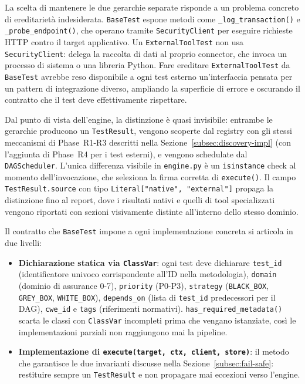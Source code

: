 

La scelta di mantenere le due gerarchie separate risponde a un problema concreto di ereditarietà indesiderata. \texttt{BaseTest} espone metodi come \texttt{\_log\_transaction()} e \texttt{\_probe\_endpoint()}, che operano tramite \texttt{SecurityClient} per eseguire richieste \gls{HTTP} contro il target applicativo. Un \texttt{ExternalToolTest} non usa \texttt{SecurityClient}: delega la raccolta di dati al proprio connector, che invoca un processo di sistema o una libreria Python. Fare ereditare \texttt{ExternalToolTest} da \texttt{BaseTest} avrebbe reso disponibile a ogni test esterno un'interfaccia pensata per un pattern di integrazione diverso, ampliando la superficie di errore e oscurando il contratto che il test deve effettivamente rispettare.

Dal punto di vista dell'engine, la distinzione è quasi invisibile: entrambe le gerarchie producono un \texttt{TestResult}, vengono scoperte dal registry con gli stessi meccanismi di Phase~R1-R3 descritti nella Sezione~\ref{subsec:discovery-impl} (con l'aggiunta di Phase~R4 per i test esterni), e vengono schedulate dal \texttt{DAGScheduler}. L'unica differenza visibile in \texttt{engine.py} è un \texttt{isinstance} check al momento dell'invocazione, che seleziona la firma corretta di \texttt{execute()}. Il campo \texttt{TestResult.source} con tipo \texttt{Literal["native",~"external"]} propaga la distinzione fino al report, dove i risultati nativi e quelli di tool specializzati vengono riportati con sezioni visivamente distinte all'interno dello stesso dominio.

Il contratto che \texttt{BaseTest} impone a ogni implementazione concreta si articola in due livelli:

\begin{itemize}
      \item \textbf{Dichiarazione statica via \texttt{ClassVar}}: ogni test deve dichiarare \texttt{test\_id} (identificatore univoco corrispondente all'ID nella metodologia), \texttt{domain} (dominio di assurance 0-7), \texttt{priority} (P0-P3), \texttt{strategy} (\texttt{BLACK\_BOX}, \texttt{GREY\_BOX}, \texttt{WHITE\_BOX}), \texttt{depends\_on} (lista di \texttt{test\_id} predecessori per il \gls{DAG}), \texttt{cwe\_id} e \texttt{tags} (riferimenti normativi). \texttt{has\_required\_metadata()} scarta le classi con \texttt{ClassVar} incompleti prima che vengano istanziate, così le implementazioni parziali non raggiungono mai la pipeline.
      \item \textbf{Implementazione di \texttt{execute(target, ctx, client, store)}}: il metodo che garantisce le due invarianti discusse nella Sezione~\ref{subsec:fail-safe}: restituire sempre un \texttt{TestResult} e non propagare mai eccezioni verso l'engine.
\end{itemize}

